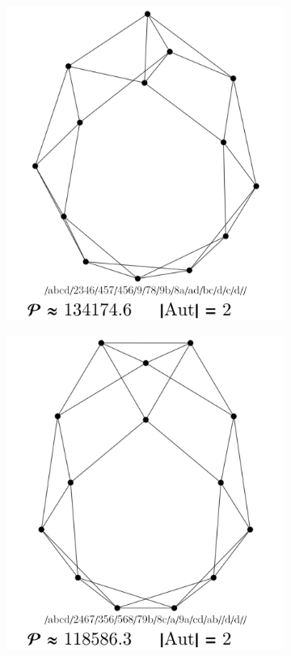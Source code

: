 \documentclass[12pt,a4paper]{article}
\renewcommand{\|}{\rule[-0.4ex]{0.2ex}{1.2em}}
\begin{document}
\begin{figure}[htb]
\begin{subfigure}[b]{.24 \textwidth}
		\subcaption{}
	\end{subfigure}
	\begin{subfigure}[b]{.24 \textwidth}
		\includegraphics[width=\linewidth]{largest_12_3}
		\subcaption{}
	\end{subfigure}
	\begin{subfigure}[b]{.24 \textwidth}
		\includegraphics[width=\linewidth]{largest_12_4}
		\subcaption{}
	\end{subfigure}
	

\end{figure}
\end{document}
